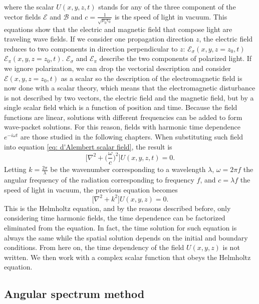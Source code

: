 \documentclass{iucr}              %
\begin{document}
where the scalar $U(x,y,z,t)$ stands for any of the three component of the vector fields $\bm{\mathcal{E}}$ and $\bm{\mathcal{B}}$ and $c= \frac{1}{\sqrt{\mu_0 \epsilon_0}}$ is the speed of light in vacuum. This equations show that the electric and magnetic field that compose light are traveling wave fields. If we consider one propagation direction $z$, the electric field reduces to two components in direction perpendicular to $z$: $\mathcal{E}_\sigma(x,y,z=z_0,t)$ $\mathcal{E}_\pi(x,y,z=z_0,t)$. $\mathcal{E}_\sigma$ and $\mathcal{E}_\pi$ describe the two components of polarized light. If we ignore polarization, we can drop the vectorial description and consider $\mathcal{E}(x,y,z=z_0,t)$ as a scalar so the description of the electromagnetic field is now done with a scalar theory, which means that the electromagnetic disturbance is not described by two vectors, the electric field and the magnetic field, but by a single scalar field which is a function of position and time. Because the field functions are linear, solutions with different frequencies can be added to form wave-packet solutions. For this reason, fields with harmonic time dependence $e^{-i\omega t}$ are those studied in the following chapters. When substituting such field into equation \ref{eq: d'Alembert scalar field}, the result is
\begin{equation}\label{eq: d'Alembert for harmonic field}
\Big[\nabla^2 + \Big(\frac{\omega}{c}\Big)^2\Big] U(x,y,z,t) = 0.
\end{equation}
Letting $k= \frac{2\pi}{\lambda}$ be the wavenumber corresponding to a wavelength $\lambda$, $\omega = 2\pi f$ the angular frequency of the radiation corresponding to frequency $f$, and $c=\lambda f$ the speed of light in vacuum, the previous equation becomes
\begin{equation}\label{eq: Helmholtz equation}
	\big[\nabla^2 + k^2\big]U(x,y,z)=0.
\end{equation}
This is the Helmholtz equation, and by the reasons described before, only considering time harmonic fields, the time dependence can be factorized eliminated from the equation. In fact, the time solution for such equation is always the same while the spatial solution depends on the initial and boundary conditions. From here on, the time dependency of the field $U(x,y,z)$ is not written. We then work with a complex scalar function that obeys the Helmholtz equation.

\subsection{Angular spectrum method}
\end{document}
